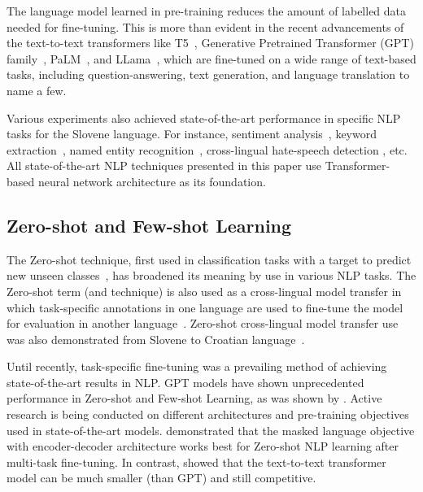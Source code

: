 The language model learned in pre-training reduces the amount of labelled data needed for fine-tuning.
This is more than evident in the recent advancements of the text-to-text transformers like T5~\parencite{raffel2020exploring}, Generative Pretrained Transformer (GPT) family~\parencite{brown2020language}, PaLM~\parencite{chowdhery2022palm}, and LLama~\parencite{touvron2023llama}, which are fine-tuned on a wide range of text-based tasks, including question-answering, text generation, and language translation to name a few.

Various experiments also achieved state-of-the-art performance in specific NLP tasks for the Slovene language. 
For instance, sentiment analysis~\parencite{pelicon2020zero}, keyword extraction~\parencite{martinc2021tntkid}, named entity recognition~\parencite{prelevikj-zitnik-2021-multilingual}, cross-lingual hate-speech detection \parencite{pelicon2021offensive}, etc.
All state-of-the-art NLP techniques presented in this paper use Transformer-based neural network architecture as its foundation.

\subsection{Zero-shot and Few-shot Learning}

The Zero-shot technique, first used in classification tasks with a target to predict new unseen classes~\parencite{chang2008zero, larochelle2008zero, palatucci2009zero}, has broadened its meaning by use in various NLP tasks.
The Zero-shot term (and technique) is also used as a cross-lingual model transfer in which task-specific annotations in one language are used to fine-tune the model for evaluation in another language~\parencite{pires2019multilingual}. Zero-shot cross-lingual model transfer use was also demonstrated from Slovene to Croatian language~\parencite{pelicon2020zero}.

Until recently, task-specific fine-tuning was a prevailing method of achieving state-of-the-art results in NLP. 
GPT models have shown unprecedented performance in Zero-shot and Few-shot Learning, as was shown by \textcite{brown2020language}.
Active research is being conducted on different architectures and pre-training objectives used in state-of-the-art models. 
\textcite{Wang2022WhatLM} demonstrated that the masked language objective with encoder-decoder architecture works best for Zero-shot NLP learning after multi-task fine-tuning. In contrast, \textcite{touvron2023llama} showed that the text-to-text transformer model can be much smaller (than GPT) and still competitive.



